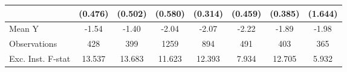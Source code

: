 {\begin{tabular}{l*{7}{c}}
            &     (0.476)         &     (0.502)         &     (0.580)         &     (0.314)         &     (0.459)         &     (0.385)         &     (1.644)         \\
\midrule
Mean Y      &       -1.54         &       -1.40         &       -2.04         &       -2.07         &       -2.22         &       -1.89         &       -1.98         \\
Observations&         428         &         399         &        1259         &         894         &         491         &         403         &         365         \\
Exc. Inst. F-stat&      13.537         &      13.683         &      11.623         &      12.393         &       7.934         &      12.705         &       5.932         \\
\bottomrule
\end{tabular}
}
